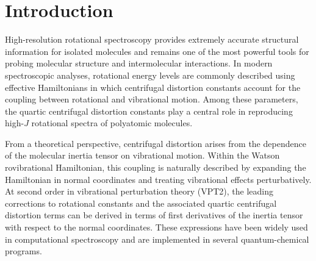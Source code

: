 \documentclass[aip,jcp,reprint]{revtex4-2}
\begin{document}
\begin{abstract}
The resulting equations therefore provide not only a practical route to the
evaluation of quartic centrifugal distortion constants at fourth perturbative
order, but also a tensor-hierarchical interpretation of how the VPT4 quartic
observable departs from the standard first-level closure.
An important conceptual consequence is that the present vibro-rotational
VPT4 problem differs structurally from the purely vibrational one. In the
latter, moving from VPT2 to VPT4 typically requires higher-order force-field
information and therefore probes the limits of a quartic force field. In the
present quartic rotational problem, by contrast, the fourth-order corrections
are generated by the cubic force field together with higher-order geometric
response terms of the inverse inertia tensor. Combined with analytic inertia
derivatives and molecular force-field data, the channel-resolved formulation
therefore enables efficient computation of quartic distortion constants for
polyatomic molecules while avoiding the combinatorial complexity of the full
BCH expansion.

\end{abstract}

\maketitle

\section{Introduction}

High-resolution rotational spectroscopy provides extremely accurate structural
information for isolated molecules and remains one of the most powerful tools
for probing molecular structure and intermolecular interactions.
\cite{BunkerJensen2005,Herzberg1945}
In modern spectroscopic analyses, rotational energy levels are commonly
described using effective Hamiltonians in which centrifugal distortion
constants account for the coupling between rotational and vibrational motion.
Among these parameters, the quartic centrifugal distortion constants
play a central role in reproducing high-$J$ rotational spectra of
polyatomic molecules.

From a theoretical perspective, centrifugal distortion arises from the
dependence of the molecular inertia tensor on vibrational motion.
Within the Watson rovibrational Hamiltonian, this coupling is naturally
described by expanding the Hamiltonian in normal coordinates and treating
vibrational effects perturbatively.
\cite{Watson1968,Watson1977,AlievWatson1976,Mills1972}
At second order in vibrational perturbation theory (VPT2), the leading
corrections to rotational constants and the associated quartic centrifugal
distortion terms can be derived in terms of first derivatives of the
inertia tensor with respect to the normal coordinates.
These expressions have been widely used in computational spectroscopy
and are implemented in several quantum-chemical programs.\cite{Franke2021,Gaw1991}
\end{document}
